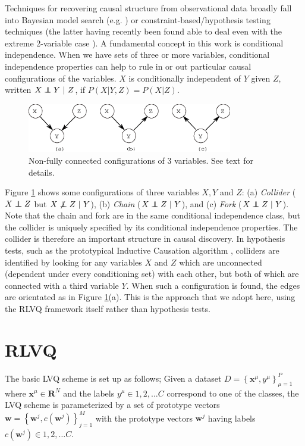 \documentclass{esannV2}
\newcommand\independent{\protect\mathpalette{\protect\independenT}{\perp}}
\def\independenT#1#2{\mathrel{\rlap{$#1#2$}\mkern2mu{#1#2}}}
\def\ci{\independent}
\def\dep{\not\independent}
\begin{document}
Techniques for recovering causal structure from observational data broadly fall into Bayesian model search (e.g. \cite{chickering03}) or constraint-based/hypothesis testing techniques \cite{06} (the latter having recently been found able to deal even with the extreme 2-variable case \cite{peters10}). A fundamental concept in this work is conditional independence. When we have sets of three or more variables, conditional independence properties can help to rule in or out particular causal configurations of the variables. $X$ is conditionally independent of $Y$ given $Z$, written $X \ci Y\ |\ Z$, if $P(X|Y,Z) = P(X|Z)$. 

\begin{figure}
	\centering
		\includegraphics[width=0.80\textwidth]{vstructure.eps}
	\caption{Non-fully connected configurations of 3 variables. See text for details.}
	\label{fig:vstructure}
\end{figure}

Figure \ref{fig:vstructure} shows some configurations of three variables $X,Y$ and $Z$: (a) \emph{Collider} ($X \ci Z$ but $X \dep Z\ |\ Y$), (b) \emph{Chain} ($X \ci Z\ |\ Y$), and (c) \emph{Fork} ($X \ci Z\ |\ Y$). Note that the chain and fork are in the same conditional independence class, but the collider is uniquely specified by its conditional independence properties. The collider is therefore an important structure in causal discovery. In hypothesis tests, such as the prototypical Inductive Causation algorithm \cite[\S 2.5]{06}, colliders are identified by looking for any variables $X$ and $Z$ which are unconnected (dependent under every conditioning set) with each other, but both of which are connected with a third variable $Y$. When such a configuration is found, the edges are orientated as in Figure \ref{fig:vstructure}(a). This is the approach that we adopt here, using the RLVQ framework itself rather than hypothesis tests.

\section{RLVQ}
\label{sec:RLVQ}

The basic LVQ scheme is set up as follows; Given a dataset $D = \left\{\textbf{x}^\mu, y^\mu\right\}^P_{\mu = 1}$ where $\textbf{x}^\mu \in \textbf{R}^N$ and the labels $y^\mu \in {1,2,\ldots C}$ correspond to one of the classes, the LVQ scheme is parameterized by a set of prototype vectors $\textbf{w} = \left\{\textbf{w}^j, c(\textbf{w}^j)\right\}^M_{j=1}$ with the prototype vectors $\textbf{w}^j$ having labels $c(\textbf{w}^j) \in {1,2,\dots C}$.
\end{document}
